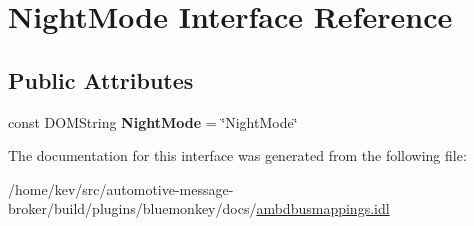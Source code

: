 \hypertarget{interfaceNightMode}{\section{Night\+Mode Interface Reference}
\label{interfaceNightMode}
}
\subsection*{Public Attributes}
\begin{DoxyCompactItemize}
\item 
\hypertarget{interfaceNightMode_aa4b90c012d03361c12ddb8536fe79993}{const D\+O\+M\+String {\bfseries Night\+Mode} = \char`\"{}Night\+Mode\char`\"{}}\label{interfaceNightMode_aa4b90c012d03361c12ddb8536fe79993}

\end{DoxyCompactItemize}


The documentation for this interface was generated from the following file\+:\begin{DoxyCompactItemize}
\item 
/home/kev/src/automotive-\/message-\/broker/build/plugins/bluemonkey/docs/\hyperlink{ambdbusmappings_8idl}{ambdbusmappings.\+idl}\end{DoxyCompactItemize}
